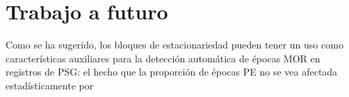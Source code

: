 
\section{Trabajo a futuro}

Como se ha sugerido, los bloques de estacionariedad pueden tener un uso como 
caracter\'isticas auxiliares
para la detecci\'on autom\'atica de \'epocas MOR en registros de PSG: el hecho que la proporci\'on
de \'epocas PE no se vea afectada estad\'isticamente por 


